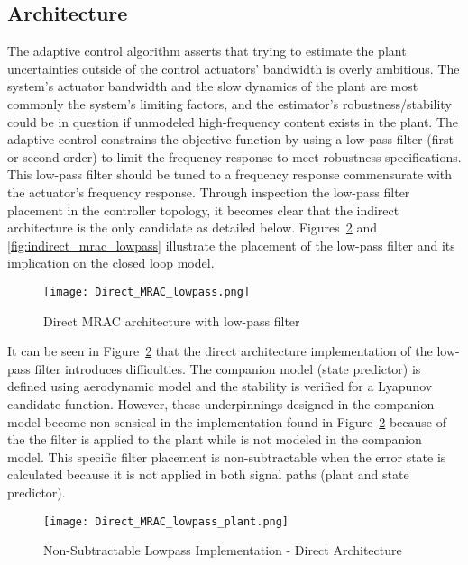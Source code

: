 \subsection{\Lone Architecture}
The \Lone adaptive control algorithm asserts that trying to estimate the plant uncertainties outside of the control actuators' bandwidth is overly ambitious.  The system's actuator bandwidth and the slow dynamics of the plant are most commonly the system's limiting factors, and the estimator's robustness/stability could be in question if unmodeled high-frequency content exists in the plant.  %
The \Lone adaptive control constrains the objective function by using a low-pass filter (first or second order) to limit the frequency response to meet robustness specifications.  This low-pass filter should be tuned to a frequency response commensurate with the actuator's frequency response.  Through inspection the low-pass filter placement in the controller topology, it becomes clear that the indirect architecture is the only candidate as detailed below.  Figures~\ref{fig:direct_mrac_lowpass} and \ref{fig:indirect_mrac_lowpass} illustrate the placement of the low-pass filter and its implication on the closed loop model. 

\begin{figure}[h!]
 \centering
  \texttt{[image: Direct\_MRAC\_lowpass.png]}
  \caption{Direct \ac{MRAC} architecture with low-pass filter }
  \label{fig:direct_mrac_lowpass}
\end{figure}
 It can be seen in Figure~\ref{fig:direct_mrac_lowpass} that the direct architecture implementation of the low-pass filter introduces difficulties.  The companion model (state predictor) is defined using aerodynamic model and the stability is verified for a Lyapunov candidate function.  However, these underpinnings designed in the companion model become non-sensical in the implementation found in Figure~\ref{fig:direct_mrac_lowpass} because of the the filter is applied to the plant while is not modeled in the companion model.  This specific filter placement is non-subtractable when the error state is calculated because it is not applied in both signal paths (plant and state predictor).
\begin{figure}[h!]
 \centering
  \texttt{[image: Direct\_MRAC\_lowpass\_plant.png]}
  \caption{Non-Subtractable Lowpass Implementation - Direct Architecture}
  \label{fig:direct_mrac_lowpass}
\end{figure}

